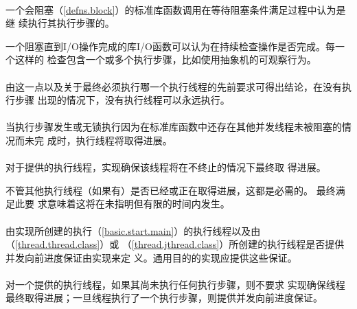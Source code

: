 \paragraph{} %
一个会阻塞（\ref{defns.block}）的标准库函数调用在等待阻塞条件满足过程中认为是继
续执行其执行步骤的。

\begin{example}
  一个阻塞直到I/O操作完成的库I/O函数可以认为在持续检查操作是否完成。每一个这样的
  检查包含一个或多个执行步骤，比如使用抽象机的可观察行为。
\end{example}

\paragraph{} %
\begin{note}
  由这一点以及关于最终必须执行哪一个执行线程的先前要求可得出结论，在没有执行步骤
  出现的情况下，没有执行线程可以永远执行。
\end{note}

\paragraph{} %
当执行步骤发生或无锁执行因为在标准库函数中还存在其他并发线程未被阻塞的情况而未完
成时，执行线程将取得进展。

\paragraph{} %
对于提供的执行线程，实现确保该线程将在不终止的情况下最终取
得进展。

\begin{note}
  不管其他执行线程（如果有）是否已经或正在取得进展，这都是必需的。 最终满足此要
  求意味着这将在未指明但有限的时间内发生。
\end{note}

\paragraph{} %
由实现所创建的执行（\ref{basic.start.main}）的执行线程以及由
（\ref{thread.thread.class}）或
（\ref{thread.jthread.class}）所创建的执行线程是否提供并发向前进度保证由实现来定
义。通用目的的实现应提供这些保证。

\paragraph{} %
对一个提供的执行线程，如果其尚未执行任何执行步骤，则不要求
实现确保线程最终取得进展；一旦线程执行了一个执行步骤，则提供并发向前进度保证。

